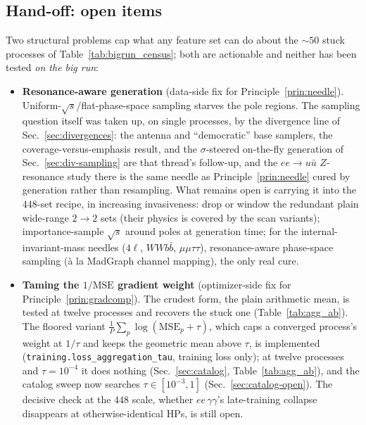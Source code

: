 \documentclass[11pt]{article}
\newcommand{\code}[1]{\texttt{#1}}
\begin{document}
\subsection{Hand-off: open items}\label{sec:bigrun-open}
Two structural problems cap what any feature set can do about the $\sim\!50$ stuck processes of
Table~\ref{tab:bigrun_census}; both are actionable and neither has been tested \emph{on the
big run}:
\begin{itemize}
  \item \textbf{Resonance-aware generation} (data-side fix for Principle~\ref{prin:needle}).
  Uniform-$\sqrt s$/flat-phase-space sampling starves the pole regions. The sampling question
  itself was taken up, on single processes, by the divergence line of Sec.~\ref{sec:divergences}:
  the antenna and ``democratic'' base samplers, the coverage-versus-emphasis result, and the
  $\sigma$-steered on-the-fly generation of Sec.~\ref{sec:div-sampling} are that thread's
  follow-up, and the $ee\to u\bar u$ $Z$-resonance study there is the same needle as
  Principle~\ref{prin:needle} cured by generation rather than resampling. What remains open is
  carrying it into the $448$-set recipe, in increasing invasiveness: drop or window the redundant
  plain wide-range $2\!\to\!2$ sets (their physics is covered by the scan variants);
  importance-sample $\sqrt s$ around poles at generation time; for the internal-invariant-mass
  needles ($4\ell$, $WWb\bar b$, $\mu\mu\tau\tau$), resonance-aware phase-space sampling
  (\`a la MadGraph channel mapping), the only real cure.
  \item \textbf{Taming the $1/\mathrm{MSE}$ gradient weight} (optimizer-side fix for
  Principle~\ref{prin:gradcomp}). The crudest form, the plain arithmetic mean, is tested at
  twelve processes and recovers the stuck one (Table~\ref{tab:agg_ab}). The floored variant
  $\frac1P\sum_p\log(\mathrm{MSE}_p+\tau)$, which caps a converged process's weight at
  $1/\tau$ and keeps the geometric mean above $\tau$, is implemented
  (\code{training.loss\_aggregation\_tau}, training loss only); at twelve processes and
  $\tau=10^{-4}$ it does nothing (Sec.~\ref{sec:catalog}, Table~\ref{tab:agg_ab}), and the
  catalog sweep now searches $\tau\in[10^{-3},1]$ (Sec.~\ref{sec:catalog-open}). The
  decisive check at the $448$ scale, whether $ee\,\gamma\gamma$'s late-training collapse
  disappears at otherwise-identical HPs, is still open.
\end{itemize}
\end{document}
